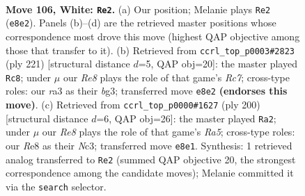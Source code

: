 \documentclass[11pt]{article}
\begin{document}
\begin{figure}[p]\centering
\begin{subfigure}{0.46\textwidth}\centering
\resizebox{\linewidth}{!}{%
\newchessgame
\chessboard[
  setfen={4R3/5k2/8/8/8/r7/6K1/3r4 w - - 22 106},
  showmover=false,
  pgfstyle=straightmove, color=movearrow, markmove={e8-e2}
]}
\caption{}
\end{subfigure}\hfill
\begin{subfigure}{0.46\textwidth}\centering
\resizebox{\linewidth}{!}{%
\newchessgame
\chessboard[
  setfen={5k2/R7/4p3/8/8/3K2B1/2r5/8 b - - 18 111},
  showmover=false,
  pgfstyle=straightmove, color=movearrow, markmove={c2-c8}
]}
\caption{}
\end{subfigure}
\\[4pt]
\begin{subfigure}{0.46\textwidth}\centering
\resizebox{\linewidth}{!}{%
\newchessgame
\chessboard[
  setfen={8/8/5K2/R7/1k6/2N5/6r1/8 w - - 5 101},
  showmover=false,
  pgfstyle=straightmove, color=movearrow, markmove={a5-a2}
]}
\caption{}
\end{subfigure}\hfill

\caption{\textbf{Move 106, White: \texttt{Re2}.} (a) Our position; Melanie plays \texttt{Re2} (\texttt{e8e2}). Panels (b)--(d) are the retrieved master positions whose correspondence most drove this move (highest QAP objective among those that transfer to it). (b) Retrieved from \texttt{ccrl\_top\_p0003\#2823} (ply 221) [structural distance $d$=5, QAP obj=20]: the master played \texttt{Rc8}; under $\mu$ our \emph{Re8} plays the role of that game's \emph{Rc7}; cross-type roles: our \emph{r}a3 as their \emph{b}g3; transferred move \texttt{e8e2} \textbf{(endorses this move)}. (c) Retrieved from \texttt{ccrl\_top\_p0000\#1627} (ply 200) [structural distance $d$=6, QAP obj=26]: the master played \texttt{Ra2}; under $\mu$ our \emph{Re8} plays the role of that game's \emph{Ra5}; cross-type roles: our \emph{R}e8 as their \emph{N}c3; transferred move \texttt{e8e1}. Synthesis: 1 retrieved analog transferred to \texttt{Re2} (summed QAP objective 20, the strongest correspondence among the candidate moves); Melanie committed it via the \texttt{search} selector.}
\label{fig:thought-m210}
\end{figure}

\clearpage
\end{document}
